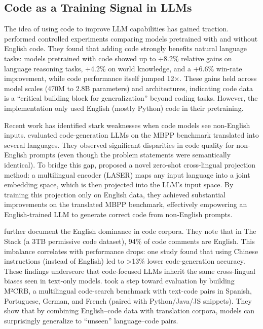 \documentclass[conference]{IEEEtran}
\begin{document}
\subsection{Code as a Training Signal in LLMs}
The idea of using code to improve LLM capabilities has gained traction. \citeauthor{code_or_not} performed controlled experiments comparing models pretrained with and without English code. They found that adding code strongly benefits natural language tasks: models pretrained with code showed up to +8.2\% relative gains on language reasoning tasks, +4.2\% on world knowledge, and a +6.6\% win-rate improvement, while code performance itself jumped 12×. These gains held across model scales (470M to 2.8B parameters) and architectures, indicating code data is a “critical building block for generalization” beyond coding tasks. However, the implementation only used English (mostly Python) code in their pretraining.  

Recent work has identified stark weaknesses when code models see non-English inputs. \citeauthor{li2025bridginglanguagegapenhancing} evaluated code-generation LLMs on the MBPP benchmark translated into several languages. They observed significant disparities in code quality for non-English prompts (even though the problem statements were semantically identical). To bridge this gap, \citeauthor{li2025bridginglanguagegapenhancing} proposed a novel zero-shot cross-lingual projection method: a multilingual encoder (LASER) maps any input language into a joint embedding space, which is then projected into the LLM's input space. By training this projection only on English data, they achieved substantial improvements on the translated MBPP benchmark, effectively empowering an English-trained LLM to generate correct code from non-English prompts.  

\citeauthor{kocetkov2022stack3tbpermissively} further document the English dominance in code corpora. They note that in The Stack (a 3TB permissive code dataset), 94\% of code comments are English. This imbalance correlates with performance drops: one study found that using Chinese instructions (instead of English) led to >13\% lower code-generation accuracy. \cite{nishigata-etal-2025-non} These findings underscore that code-focused LLMs inherit the same cross-lingual biases seen in text-only models. \citeauthor{monteiro2024multilingual} took a step toward evaluation by building M²CRB, a multilingual code-search benchmark with text-code pairs in Spanish, Portuguese, German, and French (paired with Python/Java/JS snippets). They show that by combining English–code data with translation corpora, models can surprisingly generalize to “unseen” language–code pairs.
\end{document}
